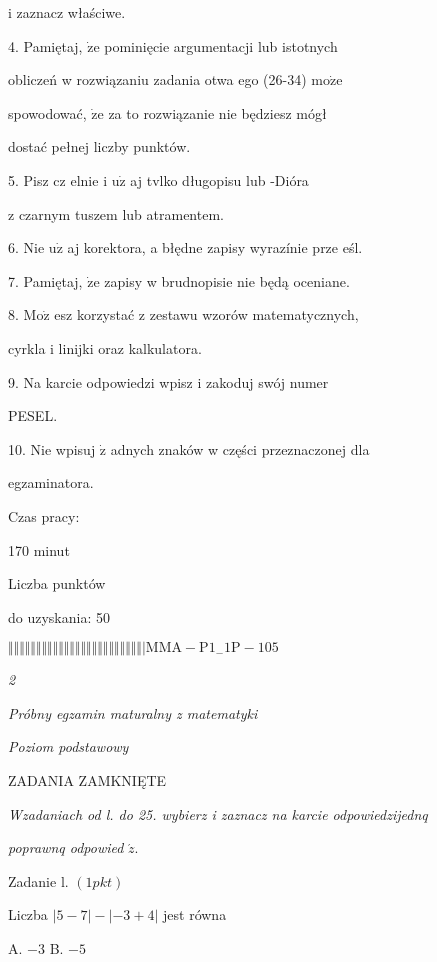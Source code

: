 \documentclass[a4paper,12pt]{article}
\begin{document}
i zaznacz właściwe.

4. Pamiętaj, $\dot{\mathrm{z}}\mathrm{e}$ pominięcie argumentacji lub istotnych

obliczeń w rozwiązaniu zadania otwa ego (26-34) $\mathrm{m}\mathrm{o}\dot{\mathrm{z}}\mathrm{e}$

spowodować, $\dot{\mathrm{z}}\mathrm{e}$ za to rozwiązanie nie będziesz mógł

dostać pełnej liczby punktów.

5. Pisz cz elnie i $\mathrm{u}\dot{\mathrm{z}}$ aj tvlko długopisu lub -Dióra

z czarnym tuszem lub atramentem.

6. Nie $\mathrm{u}\dot{\mathrm{z}}$ aj korektora, a błędne zapisy wyrazínie prze eśl.

7. Pamiętaj, $\dot{\mathrm{z}}\mathrm{e}$ zapisy w brudnopisie nie będą oceniane.

8. $\mathrm{M}\mathrm{o}\dot{\mathrm{z}}$ esz korzystać z zestawu wzorów matematycznych,

cyrkla i linijki oraz kalkulatora.

9. Na karcie odpowiedzi wpisz i zakoduj swój numer

PESEL.

10. Nie wpisuj $\dot{\mathrm{z}}$ adnych znaków w części przeznaczonej dla

egzaminatora.

Czas pracy:

170 minut

Liczba punktów

do uzyskania: 50

$\Vert\Vert\Vert\Vert\Vert\Vert\Vert\Vert\Vert\Vert\Vert\Vert\Vert\Vert\Vert\Vert\Vert\Vert\Vert\Vert\Vert\Vert\Vert\Vert|  \mathrm{M}\mathrm{M}\mathrm{A}-\mathrm{P}1_{-}1\mathrm{P}-105$




{\it 2}

{\it Próbny egzamin maturalny z matematyki}

{\it Poziom podstawowy}

ZADANIA ZAMKNIĘTE

{\it Wzadaniach od l. do 25. wybierz i zaznacz na karcie odpowiedzijednq}

{\it poprawnq odpowied} $\acute{z}.$

Zadanie l. $(1pkt)$

Liczba $|5-7|-|-3+4|$ jest równa

A. $-3$ B. $-5$
\end{document}

